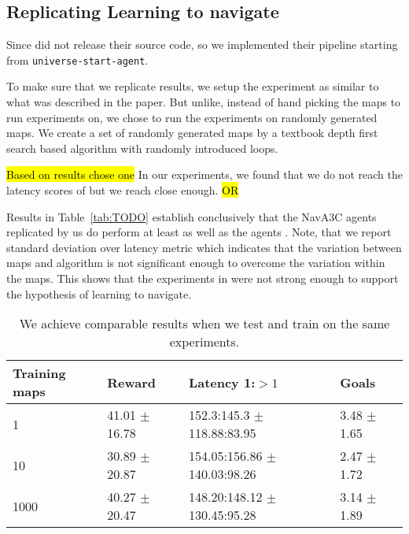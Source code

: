 %

\subsection{Replicating Learning to navigate}

Since \cite{MiPaViICLR2017} did not release their source code, so we implemented their pipeline starting from \texttt{universe-start-agent}\cite{OpenAI2017UniverseStarterAgent}.

To make sure that we replicate \cite{MiPaViICLR2017} results, we setup the experiment as similar to what was described in the paper.
But unlike, \cite{MiPaViICLR2017} instead of hand picking the maps to run experiments on, we chose to run the experiments on randomly generated maps.
We create a set of randomly generated maps by a textbook depth first search based algorithm with randomly introduced loops.

\hl{Based on results chose one}
In our experiments, we found that we do not reach the latency scores of \cite{MiPaViICLR2017} but we reach close enough.
\hl{OR}

Results in Table~\ref{tab:TODO} establish conclusively that the NavA3C agents replicated by us do perform at least as well as the agents .
Note, that we report standard deviation over latency metric which indicates that the variation between maps and algorithm is not significant enough to overcome the variation within the maps.
This shows that the experiments in \cite{MiPaViICLR2017} were not strong enough to support the hypothesis of learning to navigate.

\begin{table}[h]
  \label{sample-table}
  \begin{center}
    \begin{tabular}{llll}
      \toprule
      Training maps & Reward & Latency 1:$>1$ & Goals \\
      \midrule
      1 & 41.01 $\pm$  16.78 & 152.3:145.3 $\pm$ 118.88:83.95 & 3.48 $\pm$ 1.65 \\
      10 & 30.89 $\pm$  20.87 & 154.05:156.86 $\pm$ 140.03:98.26 & 2.47 $\pm$ 1.72 \\
      1000 & 40.27 $\pm$  20.47 & 148.20:148.12 $\pm$ 130.45:95.28 & 3.14 $\pm$ 1.89 \\
      \bottomrule
    \end{tabular}
  \end{center}
  \caption{We achieve comparable results when we test and train on the same experiments.}
\end{table}


